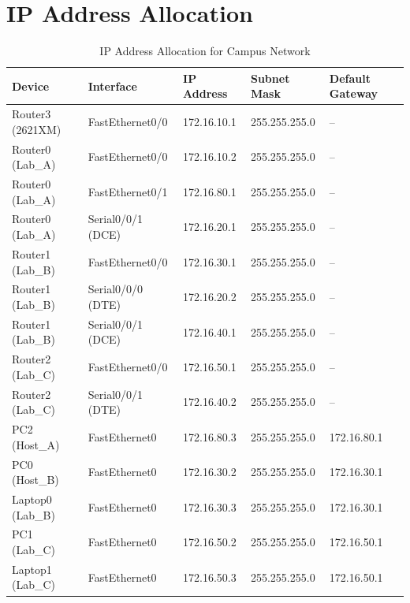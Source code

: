\documentclass[12pt, a4paper]{report}
\begin{document}
\section*{IP Address Allocation}
\begin{table}[H]
	\centering
	\begin{tabular}{|l|l|l|l|l|}
		\hline
		\textbf{Device} & \textbf{Interface} & \textbf{IP Address} & \textbf{Subnet Mask} & \textbf{Default Gateway} \\ \hline
		Router3 (2621XM)   & FastEthernet0/0   & 172.16.10.1 & 255.255.255.0 & --          \\ \hline
		Router0 (Lab\_A)   & FastEthernet0/0   & 172.16.10.2 & 255.255.255.0 & --          \\ \hline
		Router0 (Lab\_A)   & FastEthernet0/1   & 172.16.80.1 & 255.255.255.0 & --          \\ \hline
		Router0 (Lab\_A)   & Serial0/0/1 (DCE) & 172.16.20.1 & 255.255.255.0 & --          \\ \hline
		Router1 (Lab\_B)   & FastEthernet0/0   & 172.16.30.1 & 255.255.255.0 & --          \\ \hline
		Router1 (Lab\_B)   & Serial0/0/0 (DTE) & 172.16.20.2 & 255.255.255.0 & --          \\ \hline
		Router1 (Lab\_B)   & Serial0/0/1 (DCE) & 172.16.40.1 & 255.255.255.0 & --          \\ \hline
		Router2 (Lab\_C)   & FastEthernet0/0   & 172.16.50.1 & 255.255.255.0 & --          \\ \hline
		Router2 (Lab\_C)   & Serial0/0/1 (DTE) & 172.16.40.2 & 255.255.255.0 & --          \\ \hline
		PC2 (Host\_A)      & FastEthernet0     & 172.16.80.3 & 255.255.255.0 & 172.16.80.1 \\ \hline
		PC0 (Host\_B)      & FastEthernet0     & 172.16.30.2 & 255.255.255.0 & 172.16.30.1 \\ \hline
		Laptop0 (Lab\_B)   & FastEthernet0     & 172.16.30.3 & 255.255.255.0 & 172.16.30.1 \\ \hline
		PC1 (Lab\_C)       & FastEthernet0     & 172.16.50.2 & 255.255.255.0 & 172.16.50.1 \\ \hline
		Laptop1 (Lab\_C)   & FastEthernet0     & 172.16.50.3 & 255.255.255.0 & 172.16.50.1 \\ \hline
	\end{tabular}
	\caption{IP Address Allocation for Campus Network}
\end{table}
\end{document}
